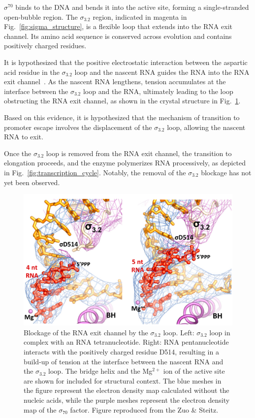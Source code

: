 $\sigma^{70}$ binds to the DNA and bends it into the active site, forming a single-stranded open-bubble region.
The $\sigma_{3.2}$ region, indicated in magenta in Fig.~\ref{fig:sigma_structure}, is a flexible loop that extends into the RNA exit channel. 
Its amino acid sequence is conserved across evolution and contains positively charged residues.

It is hypothesized that the positive electrostatic interaction between the aspartic acid residue in the $\sigma_{3.2}$ loop and the nascent RNA guides the RNA into the RNA exit channel~\cite{zuo_steitz_2015}. 
As the nascent RNA lengthens, tension accumulates at the interface between the $\sigma_{3.2}$ loop and the RNA, ultimately leading to the loop obstructing the RNA exit channel, as shown in the crystal structure in Fig.~\ref{fig:sigma_blockage}.

Based on this evidence, it is hypothesized that the mechanism of transition to promoter escape involves the displacement of the $\sigma_{3.2}$ loop, allowing the nascent RNA to exit.

Once the $\sigma_{3.2}$ loop is removed from the RNA exit channel, the transition to elongation proceeds, and the enzyme polymerizes RNA processively, as depicted in Fig.~\ref{fig:transcription_cycle}. 
Notably, the removal of the $\sigma_{3.2}$ blockage has not yet been observed. 

\begin{figure}
    \centering
    \includegraphics[width=\textwidth]{chapters/figures/sigma_blockage.jpg}
    \caption{\label{fig:sigma_blockage} 
    Blockage of the RNA exit channel by the $\sigma_{3.2}$ loop.
    Left: $\sigma_{3.2}$ loop in complex with an RNA tetranucleotide.
    Right: RNA pentanucleotide interacts with the positively charged residue D514, resulting in a build-up of tension at the interface between the nascent RNA and the $\sigma_{3.2}$ loop.
    The bridge helix and the Mg$^{2+}$ ion of the active site are shown for included for structural context.
    The blue meshes in the figure represent the electron density map calculated without the nucleic acids, while the purple meshes represent the electron density map of the $\sigma_{70}$ factor.
    Figure reproduced from the Zuo \& Steitz.~\cite{zuo_steitz_2015}
    }
\end{figure}

